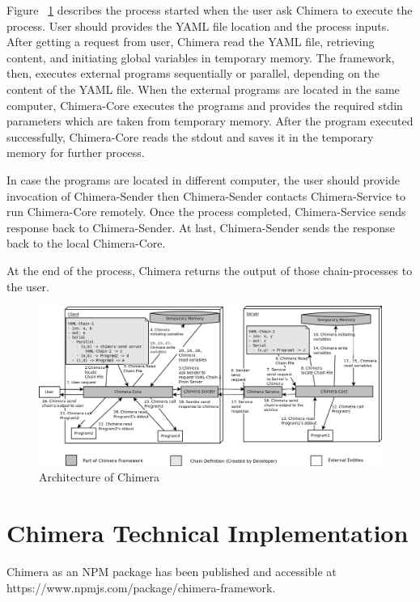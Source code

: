 \documentclass[conference]{IEEEtran}
\begin{document}
Figure ~\ref{fig:chimeraArchitecture} describes the process started when the user ask Chimera 
to execute the process. User should provides the YAML file location and the process
inputs. After getting a request from user, Chimera read the YAML file, retrieving
content, and initiating global variables in temporary memory. The framework, then,
executes external programs sequentially or parallel, depending on the content of the
YAML file. When the external programs are located in the same computer, Chimera-Core executes the
programs and provides the required stdin parameters which are taken from
temporary memory. After the program executed successfully, Chimera-Core  reads the 
stdout and saves it in the temporary memory for further process.

In case the programs are located in different computer, the user should provide
invocation of Chimera-Sender then Chimera-Sender contacts Chimera-Service to run 
Chimera-Core remotely. Once the process completed, Chimera-Service sends 
response back to Chimera-Sender. At last, Chimera-Sender sends the response back to
the local Chimera-Core.

At the end of the process, Chimera returns the output of those chain-processes to 
the user.

\begin{figure}
	\centering
	\includegraphics[width=1.0\textwidth]
		{images/chimera.png}
	\caption{Architecture of Chimera}
	\label{fig:chimeraArchitecture}
\end{figure}

\section{Chimera Technical Implementation}

Chimera as an NPM package has been published and accessible at 
https://www.npmjs.com/package/chimera-framework.
\end{document}
